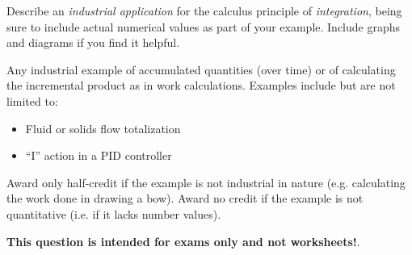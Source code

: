 

Describe an {\it industrial application} for the calculus principle of {\it integration}, being sure to include actual numerical values as part of your example.  Include graphs and diagrams if you find it helpful.

\vskip 100pt







Any industrial example of accumulated quantities (over time) or of calculating the incremental product as in work calculations.  Examples include but are not limited to:

\begin{itemize}
\item{} Fluid or solids flow totalization
\item{} ``I'' action in a PID controller
\end{itemize}

Award only half-credit if the example is not industrial in nature (e.g. calculating the work done in drawing a bow).  Award no credit if the example is not quantitative (i.e. if it lacks number values).







{\bf This question is intended for exams only and not worksheets!}.




